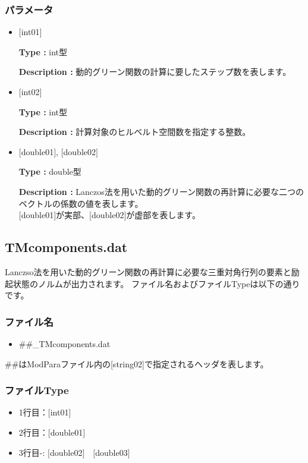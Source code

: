 \subsubsection{パラメータ}
 \begin{itemize}

  \item  $[$int01$]$

 {\bf Type :} int型

 {\bf Description :} 動的グリーン関数の計算に要したステップ数を表します。

  \item  $[$int02$]$

 {\bf Type :} int型

{\bf Description :} 計算対象のヒルベルト空間数を指定する整数。

 
 \item  $[$double01$]$, $[$double02$]$

 {\bf Type :} double型 

{\bf Description :} Lanczos法を用いた動的グリーン関数の再計算に必要な二つのベクトルの係数の値を表します。\\
$[$double01$]$が実部、$[$double02$]$が虚部を表します。\\
\end{itemize}

\newpage
\subsection{{TMcomponents.dat}}
\label{Subsec:restart}
Lanczso法を用いた動的グリーン関数の再計算に必要な三重対角行列の要素と励起状態のノルムが出力されます。
ファイル名およびファイルTypeは以下の通りです。

\subsubsection{ファイル名}
\begin{itemize}
   \item{\#\#\_TMcomponents.dat}
\end{itemize}
  \#\#はModParaファイル内の[string02]で指定されるヘッダを表します。

\subsubsection{ファイルType}
 \begin{itemize}
   \item  1行目：$[$int01$]$
   \item  2行目：$[$double01$]$
   \item  3行目-: $[$double02$]$~~$[$double03$]$
  \end{itemize}
